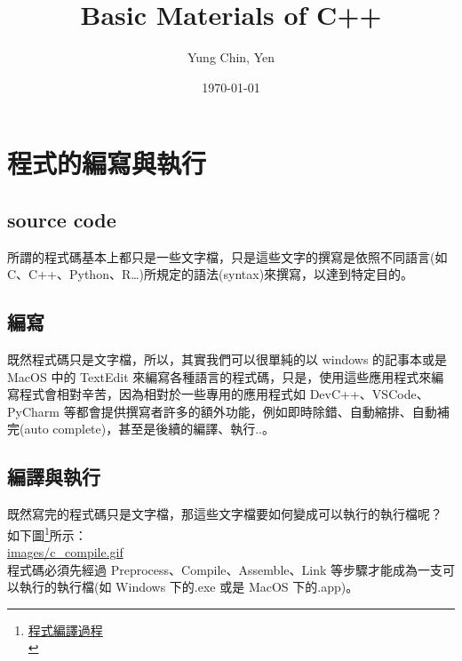 \documentclass[a4paper,12pt]{article}
\author{Yung Chin, Yen}
\date{\today}
\title{Basic Materials of C++}
\begin{document}
\maketitle
\tableofcontents

\newpage

\section{程式的編寫與執行}
\label{cpp_execution}
\subsection{source code}
\label{sec:org3d9b562}
所謂的程式碼基本上都只是一些文字檔，只是這些文字的撰寫是依照不同語言(如 C、C++、Python、R\ldots{})所規定的語法(syntax)來撰寫，以達到特定目的。\\

\subsection{編寫}
\label{sec:org0c1f780}
既然程式碼只是文字檔，所以，其實我們可以很單純的以 windows 的記事本或是 MacOS 中的 TextEdit 來編寫各種語言的程式碼，只是，使用這些應用程式來編寫程式會相對辛苦，因為相對於一些專用的應用程式如 DevC++、VSCode、PyCharm 等都會提供撰寫者許多的額外功能，例如即時除錯、自動縮排、自動補完(auto complete)，甚至是後續的編譯、執行..。\\

\subsection{編譯與執行}
\label{sec:org23623c1}
既然寫完的程式碼只是文字檔，那這些文字檔要如何變成可以執行的執行檔呢？\\
如下圖\footnote{\href{http://www2.lssh.tp.edu.tw/\~hlf/class-1/lang-c/compile.htm}{程式編譯過程}\\}所示：\\

\url{images/c\_compile.gif}\\

程式碼必須先經過 Preprocess、Compile、Assemble、Link 等步驟才能成為一支可以執行的執行檔(如 Windows 下的.exe 或是 MacOS 下的.app)。\\
\end{document}

